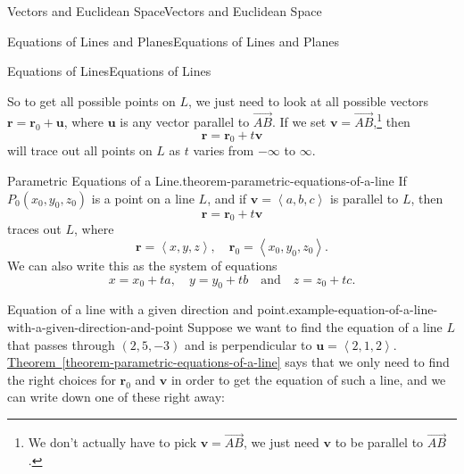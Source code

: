\documentclass[10pt,]{book}
\numberwithin{equation}{section}
\newcommand{\RR}{\mathbb{R}}
\newcommand{\vv}[1]{\mathbf{#1}}
\newcommand{\dotprod}[1]{\left\langle #1 \right\rangle}
\begin{document}
\begin{chapterptx}{Vectors and Euclidean Space}{}{Vectors and Euclidean Space}{}{}
\begin{sectionptx}{Equations of Lines and Planes}{}{Equations of Lines and Planes}{}{}
\begin{subsectionptx}{Equations of Lines}{}{Equations of Lines}{}{}
\begin{figure}
{
}
\end{figure}
\hypertarget{p-986}{}%
So to get all possible points on \(L\), we just need to look at all possible vectors \(\vv{r} = \vv{r}_{0}+\vv{u}\), where \(\vv{u}\) is any vector parallel to \(\vec{AB}\). If we set \(\vv{v} = \vec{AB}\),\footnote{We don't actually have to pick \(\vv{v} = \vec{AB}\), we just need \(\vv{v}\) to be parallel to \(\vec{AB}\).\label{fn-6}} then%
%
\begin{equation*}
\vv{r} = \vv{r}_{0}+t\vv{v}
\end{equation*}
\hypertarget{p-987}{}%
will trace out all points on \(L\) as \(t\) varies from \(-\infty\) to \(\infty\).%
\begin{theorem}{Parametric Equations of a Line.}{}{theorem-parametric-equations-of-a-line}%
\index{lines!parametric equations in \(\RR^{3}\)}\hypertarget{p-988}{}%
If \(P_{0}(x_{0},y_{0},z_{0})\) is a point on a line \(L\), and if \(\vv{v} = \dotprod{a,b,c}\) is parallel to \(L\), then%
%
\begin{equation*}
\vv{r} = \vv{r}_{0}+t\vv{v}
\end{equation*}
\hypertarget{p-989}{}%
traces out \(L\), where%
%
\begin{equation*}
\vv{r} = \dotprod{x,y,z},\quad\vv{r}_{0} = \dotprod{x_{0},y_{0},z_{0}}.
\end{equation*}
\hypertarget{p-990}{}%
We can also write this as the system of equations%
%
\begin{equation*}
x = x_{0}+ta,\quad y=y_{0}+tb\quad\text{and}\quad z = z_{0}+tc.
\end{equation*}
\end{theorem}
\begin{example}{Equation of a line with a given direction and point.}{example-equation-of-a-line-with-a-given-direction-and-point}%
\hypertarget{p-991}{}%
Suppose we want to find the equation of a line \(L\) that passes through \((2,5,-3)\) and is perpendicular to \(\vv{u} = \dotprod{2,1,2}\). \hyperref[theorem-parametric-equations-of-a-line]{Theorem~\ref{theorem-parametric-equations-of-a-line}} says that we only need to find the right choices for \(\vv{r}_{0}\) and \(\vv{v}\) in order to get the equation of such a line, and we can write down one of these right away:%

\end{example}
\end{subsectionptx}
\end{sectionptx}
\end{chapterptx}
\end{document}
